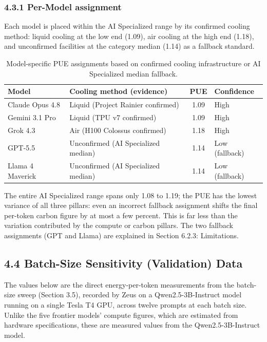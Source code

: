 \documentclass[11pt]{article}
\begin{document}
\subsubsection*{4.3.1 Per-Model assignment}

Each model is placed within the AI Specialized range by its confirmed cooling method: liquid cooling at the low end (1.09), air cooling at the high end (1.18), and unconfirmed facilities at the category median (1.14) as a fallback standard.

\begin{table}[htbp]
  \centering
  \begin{tabularx}{\textwidth}{@{}l L c l@{}}
    \toprule
    \textbf{Model} & \textbf{Cooling method (evidence)} & \textbf{PUE} & \textbf{Confidence} \\
    \midrule
    Claude Opus 4.8  & Liquid (Project Rainier confirmed) & 1.09 & High \\
    Gemini 3.1 Pro   & Liquid (TPU v7 confirmed)          & 1.09 & High \\
    Grok 4.3         & Air (H100 Colossus confirmed)      & 1.18 & High \\
    GPT-5.5          & Unconfirmed (AI Specialized median)& 1.14 & Low (fallback) \\
    Llama 4 Maverick & Unconfirmed (AI Specialized median)& 1.14 & Low (fallback) \\
    \bottomrule
  \end{tabularx}
  \caption{Model-specific PUE assignments based on confirmed cooling infrastructure or AI Specialized median fallback.}
  \label{tab:pue-assignment}
\end{table}

The entire AI Specialized range spans only 1.08 to 1.19; the PUE has the lowest variance of all three pillars: even an incorrect fallback assignment shifts the final per-token carbon figure by at most a few percent. This is far less than the variation contributed by the compute or carbon pillars. The two fallback assignments (GPT and Llama) are explained in Section 6.2.3: Limitations.

\subsection*{4.4 Batch-Size Sensitivity (Validation) Data}

The values below are the direct energy-per-token measurements from the batch-size sweep (Section 3.5), recorded by Zeus on a Qwen2.5-3B-Instruct model running on a single Tesla T4 GPU, across twelve prompts at each batch size. Unlike the five frontier models' compute figures, which are estimated from hardware specifications, these are measured values from the Qwen2.5-3B-Instruct model.
\end{document}
